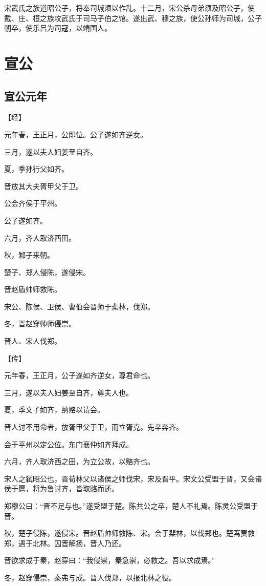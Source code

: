 \documentclass[a4paper,12pt,UTF8,twoside]{ctexbook}
\begin{document}
宋武氏之族道昭公子，将奉司城须以作乱。十二月，宋公杀母弟须及昭公子，使戴、庄、桓之族攻武氏于司马子伯之馆。遂出武、穆之族，使公孙师为司城，公子朝卒，使乐吕为司寇，以靖国人。


\chapter{宣公}

\section{宣公元年}


【经】

元年春，王正月，公即位。公子遂如齐逆女。

三月，遂以夫人妇姜至自齐。

夏，季孙行父如齐。

晋放其大夫胥甲父于卫。

公会齐侯于平州。

公子遂如齐。

六月，齐人取济西田。

秋，邾子来朝。

楚子、郑人侵陈，遂侵宋。

晋赵盾帅师救陈。

宋公、陈侯、卫侯、曹伯会晋师于棐林，伐郑。

冬，晋赵穿帅师侵崇。

晋人、宋人伐郑。

【传】

元年春，王正月，公子遂如齐逆女，尊君命也。

三月，遂以夫人妇姜至自齐，尊夫人也。

夏，季文子如齐，纳赂以请会。

晋人讨不用命者，放胥甲父于卫，而立胥克。先辛奔齐。

会于平州以定公位。东门襄仲如齐拜成。

六月，齐人取济西之田，为立公故，以赂齐也。

宋人之弑昭公也，晋荀林父以诸侯之师伐宋，宋及晋平。宋文公受盟于晋，又会诸侯于扈，将为鲁讨齐，皆取赂而还。

郑穆公曰：“晋不足与也。”遂受盟于楚。陈共公之卒，楚人不礼焉。陈灵公受盟于晋。

秋，楚子侵陈，遂侵宋。晋赵盾帅师救陈、宋。会于棐林，以伐郑也。楚蒍贾救郑，遇于北林。囚晋解扬，晋人乃还。

晋欲求成于秦，赵穿曰：“我侵崇，秦急崇，必救之。吾以求成焉。”

冬，赵穿侵崇，秦弗与成。晋人伐郑，以报北林之役。
\end{document}
